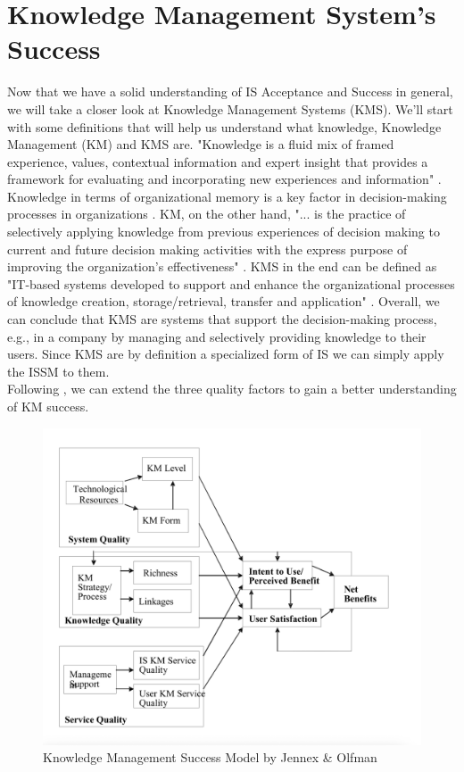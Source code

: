 \documentclass[
	english,
	ruledheaders=section,%
	class=report,%
	thesis={type=bachelor},%
	accentcolor=1b,%
	custommargins=true,%
	marginpar=false,%
	parskip=half-,%
	fontsize=11pt,%
	DIV=14,
]{tudapub}
\begin{document}
\section{Knowledge Management System's Success}
Now that we have a solid understanding of IS Acceptance and Success in general, we will take a closer look at Knowledge Management Systems (KMS). We'll start with some definitions that will help us understand what knowledge, Knowledge Management (KM) and KMS are. "Knowledge is a fluid mix of framed experience, values, contextual information and expert insight that provides a framework for
evaluating and incorporating new experiences and information" \parencite[p.~4]{Davenport1998}. Knowledge in terms of organizational memory is a key factor in decision-making processes in organizations \parencite[p.~52]{Jennex2006}. KM, on the other hand, "... is the practice of selectively applying knowledge from previous experiences of decision making to current and future decision making activities with the express purpose of improving the organization’s effectiveness" \parencite[p.~1]{Jennex2006WhatIsKM}. KMS in the end can be defined as "IT-based systems developed to support and
enhance the organizational processes of knowledge creation, storage/retrieval, transfer and application" \parencite[p.~114]{Alavi2001}. Overall, we can conclude that KMS are systems that support the decision-making process, e.g., in a company by managing and selectively providing knowledge to their users. Since KMS are by definition a specialized form of IS we can simply apply the ISSM to them.\\
Following \cite{Jennex2006}, we can extend the three quality factors to gain a better understanding
of KM success.\\
\begin{figure}
    \centering
    \includegraphics[width=0.6\linewidth]{images/knowledge_management_success.png}
    \caption{Knowledge Management Success Model by Jennex \& Olfman \parencite[p.~56]{Jennex2006}}
    \label{fig:enter-label}
\end{figure}
\end{document}
